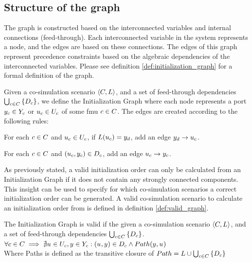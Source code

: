 \documentclass[runningheads]{llncs}
\begin{document}
\subsection{Structure of the graph}
The graph is constructed based on the interconnected variables and internal connections (feed-through). Each interconnected variable in the system represents a node, and the edges are based on these connections. The edges of this graph represent precedence constraints based on the algebraic dependencies of the interconnected variables. Please see definition \ref{def:initialization_graph} for a formal definition of the graph.

\begin{definition}\label{def:initialization_graph}
  Given a co-simulation scenario $ \left\langle C, L \right\rangle $, and a set of feed-through dependencies $\bigcup_{c \in C}  \left\{ D_{c} \right\}$, we define the Initialization Graph where each node represents a port $y_{c} \in Y_{c}$ or $u_{c} \in U_{c}$ of some fmu $c \in C$. The edges are created according to the following rules:
  \begin{compactenum}
    \item For each $c \in C$ and $u_{c} \in U_{c}$, if $L(u_{c}) = y_{d}$, add an edge $y_{d} -> u_{c}$.
    \item For each $c \in C$ and $(u_{c},y_{c}) \in D_{c}$, add an edge $u_{c} -> y_{c}$.
  \end{compactenum}
\end{definition}

\noindent As previously stated, a valid initialization order can only be calculated from an Initialization Graph if it does not contain any strongly connected components. This insight can be used to specify for which co-simulation scenarios a correct initialization order can be generated. A valid co-simulation scenario to calculate an initialization order from is defined in definition \ref{def:valid_graph}.

\begin{definition}\label{def:valid_graph}
  The Initialization Graph is valid if the given a co-simulation scenario $ \left\langle C, L \right\rangle $, and a set of feed-through dependencies $\bigcup_{c \in C}  \left\{ D_{c} \right\}$.
  $\forall c \in C \implies \nexists u_{} \in U_{c}, y_{} \in Y_{c}: (u_{},y_{}) \in D_{c} \land Path(y_{}, u_{})$\\
  Where Paths is defined as the transitive closure of $Path = L \cup \bigcup_{c \in C}  \left\{ D_{c} \right\}$
\end{definition}
\end{document}
